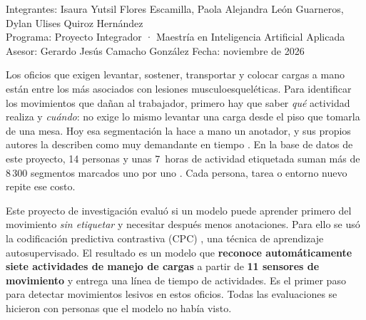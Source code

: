 \documentclass[letterpaper,11pt]{article}
\begin{document}
\thispagestyle{primera}

\smallskip
\noindent{\large\textcolor{black!60}{Resumen ejecutivo}\par}
\medskip

\noindent\begingroup\setlength{\fboxsep}{7pt}%
\colorbox{black!8}{\parbox{\dimexpr\linewidth-2\fboxsep\relax}{\small{}%
\textcolor{black!60}{Integrantes:} Isaura Yutsil Flores Escamilla, Paola Alejandra León Guarneros, Dylan Ulises Quiroz Hernández\\
\textcolor{black!60}{Programa:} Proyecto Integrador · Maestría en Inteligencia Artificial Aplicada\\
\textcolor{black!60}{Asesor:} Gerardo Jesús Camacho González \quad \textcolor{black!60}{Fecha:} noviembre de 2026}}%
\endgroup\par\medskip

Los oficios que exigen levantar, sostener, transportar y colocar cargas a mano están entre los más asociados con lesiones musculoesqueléticas. Para identificar los movimientos que dañan al trabajador, primero hay que saber \emph{qué} actividad realiza y \emph{cuándo}: no exige lo mismo levantar una carga desde el piso que tomarla de una mesa. Hoy esa segmentación la hace a mano un anotador, y sus propios autores la describen como muy demandante en tiempo \parencite{bassani2025}. En la base de datos de este proyecto, 14 personas y unas 7~horas de actividad etiquetada suman más de 8\,300 segmentos marcados uno por uno \parencite{bassani2021dataset}. Cada persona, tarea o entorno nuevo repite ese costo.

Este proyecto de investigación evaluó si un modelo puede aprender primero del movimiento \emph{sin etiquetar} y necesitar después menos anotaciones. Para ello se usó la codificación predictiva contrastiva (CPC) \parencite{vandenoord2018,haresamudram2021}, una técnica de aprendizaje autosupervisado. El resultado es un modelo que \textbf{reconoce automáticamente siete actividades de manejo de cargas} a partir de \textbf{11 sensores de movimiento} y entrega una línea de tiempo de actividades. Es el primer paso para detectar movimientos lesivos en estos oficios. Todas las evaluaciones se hicieron con personas que el modelo no había visto.
\end{document}
